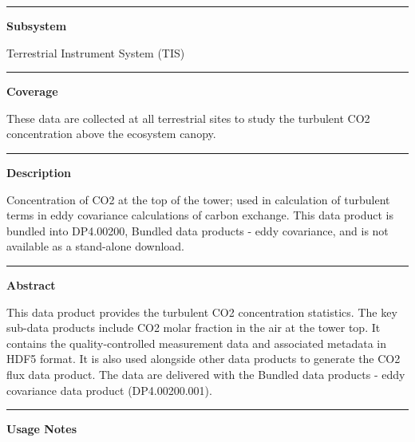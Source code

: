 \documentclass[]{article}
\begin{document}
\begin{center}\rule{0.5\linewidth}{\linethickness}\end{center}

\textbf{Subsystem}

Terrestrial Instrument System (TIS)

\begin{center}\rule{0.5\linewidth}{\linethickness}\end{center}

\textbf{Coverage}

These data are collected at all terrestrial sites to study the turbulent
CO2 concentration above the ecosystem canopy.

\begin{center}\rule{0.5\linewidth}{\linethickness}\end{center}

\textbf{Description}

Concentration of CO2 at the top of the tower; used in calculation of
turbulent terms in eddy covariance calculations of carbon exchange. This
data product is bundled into DP4.00200, Bundled data products - eddy
covariance, and is not available as a stand-alone download.

\begin{center}\rule{0.5\linewidth}{\linethickness}\end{center}

\textbf{Abstract}

This data product provides the turbulent CO2 concentration statistics.
The key sub-data products include CO2 molar fraction in the air at the
tower top. It contains the quality-controlled measurement data and
associated metadata in HDF5 format. It is also used alongside other data
products to generate the CO2 flux data product. The data are delivered
with the Bundled data products - eddy covariance data product
(DP4.00200.001).

\begin{center}\rule{0.5\linewidth}{\linethickness}\end{center}

\textbf{Usage Notes}
\end{document}

